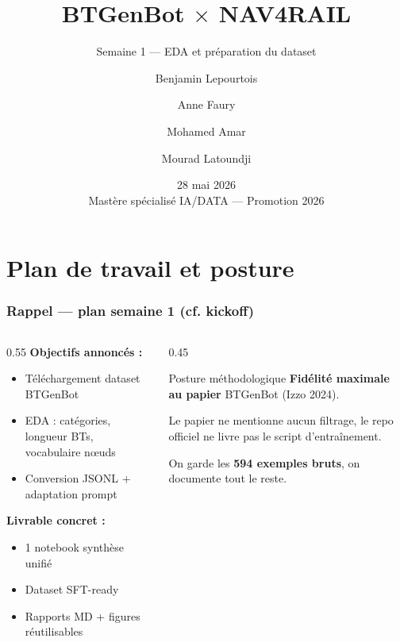\documentclass[aspectratio=169]{beamer}
\title{BTGenBot $\times$ NAV4RAIL}
\subtitle{Semaine 1 --- EDA et préparation du dataset}
\author{Benjamin Lepourtois \and Anne Faury \and Mohamed Amar \and Mourad Latoundji}
\institute{Télécom Paris}
\date[28 mai 2026]{28 mai 2026 \\ {\small Mastère spécialisé IA/DATA --- Promotion 2026}}
\begin{document}
\maketitle

\section{Plan de travail et posture}

\begin{frame}
  \frametitle{Rappel --- plan semaine 1 (cf. kickoff)}

  \begin{columns}[T]
    \begin{column}{0.55\textwidth}
      \textbf{Objectifs annoncés :}
      \begin{itemize}\itemsep2pt
        \item Téléchargement dataset BTGenBot
        \item EDA : catégories, longueur BTs, vocabulaire nœuds
        \item Conversion JSONL + adaptation prompt
      \end{itemize}

      \vspace{0.5em}
      \textbf{Livrable concret :}
      \begin{itemize}\itemsep2pt
        \item 1 notebook synthèse unifié
        \item Dataset SFT-ready
        \item Rapports MD + figures réutilisables
      \end{itemize}
    \end{column}
    \begin{column}{0.45\textwidth}
      \begin{alertblock}{Posture méthodologique}
        \small \textbf{Fidélité maximale au papier} BTGenBot (Izzo 2024).

        \vspace{0.3em}
        Le papier ne mentionne aucun filtrage, le repo officiel ne livre pas le script d'entraînement.

        \vspace{0.3em}
        On garde les \textbf{594 exemples bruts}, on documente tout le reste.
      \end{alertblock}
    \end{column}
  \end{columns}
\end{frame}
\end{document}

